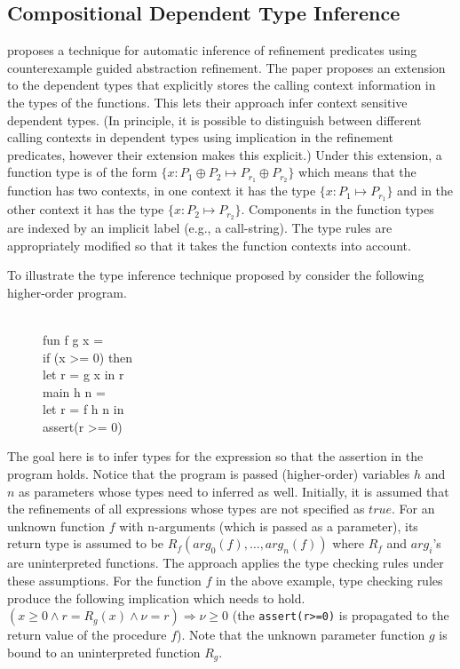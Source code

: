 \newcommand{\ctx}{\oplus}
\subsection{Compositional Dependent Type Inference}

\cite{sujag:VMCAI13} proposes a technique for automatic inference of refinement predicates 
using counterexample guided abstraction refinement. 
The paper proposes an extension to the dependent types that
explicitly stores the calling context information in the types of the functions.
This lets their approach infer context sensitive dependent types.
(In principle, it is possible to distinguish between different calling contexts in dependent types 
using implication in the refinement predicates, however their extension makes this explicit.)
Under this extension, a function type is of the form $\{ x:P_1 \ctx P_2 \mapsto P_{r_1} \ctx P_{r_2}\}$ 
which means that the function has two contexts, in one context it has the type $\{x:P_1 \mapsto  P_{r_1} \}$ 
and in the other context it has the type $\{x:P_2 \mapsto  P_{r_2} \}$. Components in the function types
are indexed by an implicit label (e.g., a call-string).
The type rules are appropriately modified so that it takes the function contexts into account.

To illustrate the type inference technique proposed by \cite{sujag:VMCAI12} consider the following
higher-order program.
%
\begin{figure}
\begin{myprogram}
\\
\pnl \> fun f g x = \\
\pnl \>  \> if (x >= 0) then \\
\pnl \>  \> \>  let r = g x in r \\
\pnl \> main h n =  \\
\pnl \> \> let r = f h n in \\
\pnl \> \> assert(r >= 0)
\end{myprogram}
\end{figure}
%
The goal here is to infer types for the expression so that the assertion in the program holds.
Notice that the program is passed (higher-order) variables $h$ and $n$ as parameters whose
types need to inferred as well.
Initially, it is assumed that the refinements of all expressions whose types are not specified as $true$.
For an unknown function $f$ with n-arguments (which is passed as a parameter), 
its return type is assumed to be $R_f(arg_0(f),\ldots,arg_n(f))$ where 
$R_f$ and $arg_i$'s are uninterpreted functions.
The approach applies the type checking rules under these assumptions.
For the function $f$ in the above example, 
type checking rules produce the following implication which needs to hold.
$(x \ge 0 \wedge r = R_g(x) \wedge \nu = r) \Rightarrow \nu \ge 0$
(the \texttt{assert(r>=0)} is propagated to the return value of the procedure $f$).
Note that the unknown parameter function $g$ is bound to an uninterpreted function $R_g$.

